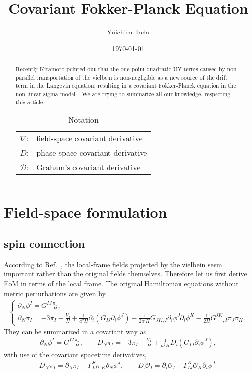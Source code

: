 \documentclass[aps, prd
, preprint
, nofootinbib 
, longbibliography
]{revtex4-1}
\newcommand{\dps}{\displaystyle}
\newcommand{\calD}{\mathcal{D}}
\newcommand{\calO}{\mathcal{O}}
\newcommand{\bae}[1]{\begin{align} #1 \end{align}}
\newcommand{\bce}[1]{\begin{cases} #1 \end{cases}}
\begin{document}
\title{Covariant Fokker-Planck Equation}
\date{\today}

\author{Yuichiro Tada}


\begin{abstract}
Recently Kitamoto pointed out that the one-point quadratic UV terms caused by non-parallel transportation of the vielbein is non-negligible as a new source of the drift term in the Langevin equation,
resulting in a covariant Fokker-Planck equation in the non-linear sigma model~\cite{Kitamoto:2018dek}.
We are trying to summarize all our knowledge, respecting this article.
\begin{table}[htbp]
	\centering
	\caption{Notation}
	\begin{tabular}{rl}
		$\nabla$: & field-space covariant derivative \\
		$D$: & phase-space covariant derivative \\
		$\calD$: & Graham's covariant derivative
	\end{tabular}
\end{table}
\end{abstract}

\maketitle
\tableofcontents


\section{Field-space formulation}

\subsection{spin connection}

According to Ref.~\cite{Kitamoto:2018dek}, the local-frame fields projected by the vielbein seem
important rather than the original fields themselves. Therefore let us first derive EoM in terms of the local frame.
The original Hamiltonian equations without metric perturbations are given by
\bae{
    \bce{
        \dps
        \partial_N\phi^I=G^{IJ}\frac{\pi_J}{H}, \\
        \dps
        \partial_N\pi_I=-3\pi_I-\frac{V_I}{H}+\frac{1}{a^2H}\partial_i\left(G_{IJ}\partial_i\phi^J\right)
        -\frac{1}{2a^2H}G_{JK,I}\partial_i\phi^J\partial_i\phi^K-\frac{1}{2H}G^{JK}{}_{,I}\pi_J\pi_K.
    }
}
They can be summarized in a covariant way as
\bae{
    \partial_N\phi^I=G^{IJ}\frac{\pi_J}{H}, \qquad D_N\pi_I=-3\pi_I-\frac{V_I}{H}+\frac{1}{a^2H}D_i\left(G_{IJ}\partial_i\phi^J\right),
}
with use of the covariant spacetime derivatives,
\bae{
    D_N\pi_I=\partial_N\pi_I-\Gamma^K_{IJ}\pi_K\partial_N\phi^J, \qquad 
    D_i\calO_I=\partial_i\calO_I-\Gamma^K_{IJ}\calO_K\partial_i\phi^J.
} 
\end{document}
